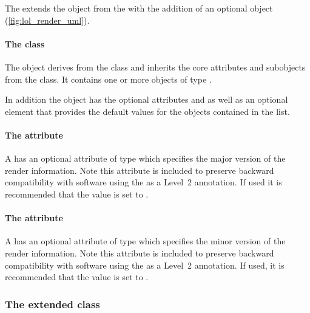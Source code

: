 The \RenderPackage extends the  object from the \LayoutPackage with the
addition of an optional \ListOfGlobalRenderInformation object (\ref{fig:lol_render_uml}).

\paragraph{The  class}
\label{listofglobalrenderinformation-class}

The \ListOfGlobalRenderInformation object derives from the
 class and inherits the core attributes and subobjects from the
 class. It contains one or more objects of type
\GlobalRenderInformation.

In addition the \ListOfGlobalRenderInformation object has the optional attributes 
 and  as well as an optional \DefaultValues 
element that provides the default values for the \GlobalRenderInformation objects
contained in the list.

\paragraph{The \fixttspace{} attribute}

A \ListOfGlobalRenderInformation has an optional attribute
 of type  which specifies the major version of the render information.  Note this attribute is included to preserve backward compatibility with software using the \RenderPackage as a Level~2 annotation. If used it is recommended that the value is set to .
 
\paragraph{The \fixttspace{} attribute}

A \ListOfGlobalRenderInformation has an optional attribute
 of type  which specifies the minor version of the render information.  Note this attribute is included to preserve backward compatibility with software using the \RenderPackage as a Level~2 annotation. If used, it is recommended that the value is set to .
 

\subsubsection{The extended  class}
\label{layout-class}

